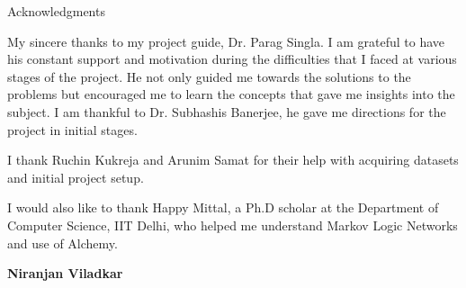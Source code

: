 \begin{center}
\LARGE{Acknowledgments} 
\end{center}

\vspace{0.5in}

My sincere thanks to my project guide, Dr. Parag Singla.
I am grateful to have his constant support and motivation
during the difficulties that I faced at various stages of the project. 
He not only guided me towards the solutions to the problems but encouraged 
me to learn the concepts that gave me insights into the subject. I am thankful 
to Dr. Subhashis Banerjee, he gave me directions for the project in initial stages.

I thank Ruchin Kukreja and Arunim Samat 
for their help with acquiring datasets and initial project setup.

I would also like to thank Happy Mittal, a Ph.D scholar at the Department of Computer Science, IIT Delhi, 
who helped me understand Markov Logic Networks and use of Alchemy.
\vspace{1.5in}

{\bfseries Niranjan Viladkar}
